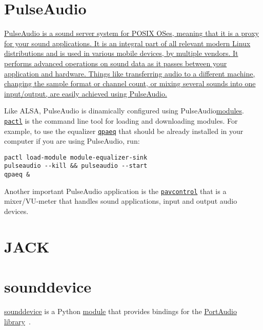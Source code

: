 \section{PulseAudio}

\href{https://www.freedesktop.org/wiki/Software/PulseAudio/}{PulseAudio
  is a sound server system for POSIX OSes, meaning that it is a proxy
  for your sound applications. It is an integral part of all relevant
  modern Linux distributions and is used in various mobile devices, by
  multiple vendors. It performs advanced operations on sound data as
  it passes between your application and hardware. Things like
  transferring audio to a different machine, changing the sample
  format or channel count, or mixing several sounds into one
  input/output, are easily achieved using
  PulseAudio.}~\cite{newmarch2017pulseaudio}

Like ALSA, PulseAudio is dinamically configured using
PulseAudio\href{https://www.freedesktop.org/wiki/Software/PulseAudio/Documentation/User/Modules/}{modules}. \texttt{\href{https://linux.die.net/man/1/pactl}{pactl}}
is the command line tool for loading and downloading modules. For
example, to use the equalizer
\texttt{\href{https://www.freedesktop.org/wiki/Software/PulseAudio/Documentation/User/Equalizer/}{qpaeq}}
that should be already installed in your computer if you are using
PulseAudio, run:

\begin{verbatim}
pactl load-module module-equalizer-sink
pulseaudio --kill && pulseaudio --start
qpaeq &
\end{verbatim}

Another important PulseAudio application is the
\texttt{\href{https://freedesktop.org/software/pulseaudio/pavucontrol/}{pavcontrol}}
that is a mixer/VU-meter that handles sound applications, input and
output audio devices.

\section{JACK}


\section{sounddevice}
\href{https://python-sounddevice.readthedocs.io}{sounddevice} is a
Python \href{https://docs.python.org/3/tutorial/modules.html}{module}
that provides bindings for the
\href{http://www.portaudio.com/}{PortAudio
  library}~\cite{sounddevice}.

